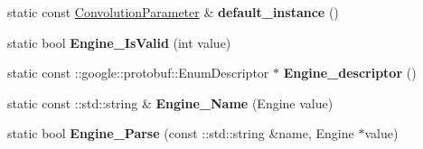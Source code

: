 \begin{DoxyCompactItemize}
static const \mbox{\hyperlink{classcaffe_1_1_convolution_parameter}{Convolution\+Parameter}} \& {\bfseries default\+\_\+instance} ()
\item 
\mbox{\label{classcaffe_1_1_convolution_parameter_a19b2ca3da6c78edc6a7cdc7eee884a73}} 
static bool {\bfseries Engine\+\_\+\+Is\+Valid} (int value)
\item 
\mbox{\label{classcaffe_1_1_convolution_parameter_a23a4f2961e4f9f02ca0d27d39406fd69}} 
static const \+::google\+::protobuf\+::\+Enum\+Descriptor $\ast$ {\bfseries Engine\+\_\+descriptor} ()
\item 
\mbox{\label{classcaffe_1_1_convolution_parameter_a991bf0ab43a54ce655215f5942dfad9f}} 
static const \+::std\+::string \& {\bfseries Engine\+\_\+\+Name} (Engine value)
\item 
\mbox{\label{classcaffe_1_1_convolution_parameter_a047082beef073728bf3b23604a20d64a}} 
static bool {\bfseries Engine\+\_\+\+Parse} (const \+::std\+::string \&name, Engine $\ast$value)
\end{DoxyCompactItemize}
